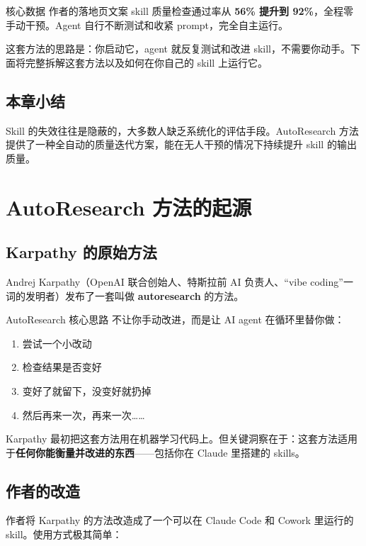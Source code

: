 \documentclass[a4paper]{article}
\begin{document}
\begin{importantbox}{核心数据}
作者的落地页文案 skill 质量检查通过率从 \textbf{56\% 提升到 92\%}，全程零手动干预。Agent 自行不断测试和收紧 prompt，完全自主运行。
\end{importantbox}

这套方法的思路是：你启动它，agent 就反复测试和改进 skill，不需要你动手。下面将完整拆解这套方法以及如何在你自己的 skill 上运行它。

\subsection{本章小结}

Skill 的失效往往是隐蔽的，大多数人缺乏系统化的评估手段。AutoResearch 方法提供了一种全自动的质量迭代方案，能在无人干预的情况下持续提升 skill 的输出质量。

\section{AutoResearch 方法的起源}

\subsection{Karpathy 的原始方法}

Andrej Karpathy（OpenAI 联合创始人、特斯拉前 AI 负责人、``vibe coding''一词的发明者）发布了一套叫做 \textbf{autoresearch} 的方法。

\begin{importantbox}{AutoResearch 核心思路}
不让你手动改进，而是让 AI agent 在循环里替你做：
\begin{enumerate}
    \item 尝试一个小改动
    \item 检查结果是否变好
    \item 变好了就留下，没变好就扔掉
    \item 然后再来一次，再来一次……
\end{enumerate}
\end{importantbox}

Karpathy 最初把这套方法用在机器学习代码上。但关键洞察在于：这套方法适用于\textbf{任何你能衡量并改进的东西}——包括你在 Claude 里搭建的 skills。

\subsection{作者的改造}

作者将 Karpathy 的方法改造成了一个可以在 Claude Code 和 Cowork 里运行的 skill。使用方式极其简单：
\end{document}

